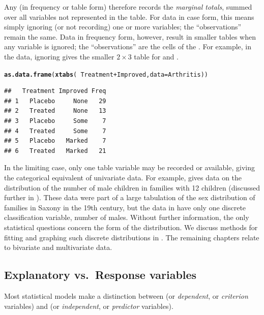 \documentclass[11pt]{book}\usepackage[]{graphicx}\usepackage[]{color}
\makeatletter
\newcommand{\hlopt}[1]{\textcolor[rgb]{0,0,0}{#1}}%
\newcommand{\hlstd}[1]{\textcolor[rgb]{0.345,0.345,0.345}{#1}}%
\newcommand{\hlkwc}[1]{\textcolor[rgb]{0.333,0.667,0.333}{#1}}%
\newcommand{\hlkwd}[1]{\textcolor[rgb]{0.737,0.353,0.396}{\textbf{#1}}}%
\newenvironment{kframe}{%
 \def\at@end@of@kframe{}%
 \ifinner\ifhmode%
  \def\at@end@of@kframe{\end{minipage}}%
  \begin{minipage}{\columnwidth}%
 \fi\fi%
 \def\FrameCommand##1{\hskip\@totalleftmargin \hskip-\fboxsep
 \colorbox{shadecolor}{##1}\hskip-\fboxsep
     \hskip-\linewidth \hskip-\@totalleftmargin \hskip\columnwidth}%
 \MakeFramed {\advance\hsize-\width
   \@totalleftmargin\z@ \linewidth\hsize
   \@setminipage}}%
 {\par\unskip\endMakeFramed%
 \at@end@of@kframe}
\newenvironment{knitrout}{}{} %
\renewenvironment{knitrout}{\small\renewcommand{\baselinestretch}{.85}}{} %
\makeatother
\begin{document}
Any \ctab (in frequency or table form) therefore records the \emph{marginal totals}, summed over all
variables not represented in the table.
For data in case form, this means simply ignoring (or not recording)
one or more variables;  the ``observations'' remain the same.
Data in frequency form, however, result in smaller tables when
any variable is ignored;  the ``observations'' are the cells of
the \ctab. For example, in the  data, ignoring 
gives the smaller $2 \times 3$ table for  and .
\begin{knitrout}
\color{fgcolor}\begin{kframe}
\begin{alltt}
\hlkwd{as.data.frame}\hlstd{(}\hlkwd{xtabs}\hlstd{(}\hlopt{~}\hlstd{Treatment} \hlopt{+} \hlstd{Improved,} \hlkwc{data}\hlstd{=Arthritis))}
\end{alltt}
\begin{verbatim}
##   Treatment Improved Freq
## 1   Placebo     None   29
## 2   Treated     None   13
## 3   Placebo     Some    7
## 4   Treated     Some    7
## 5   Placebo   Marked    7
## 6   Treated   Marked   21
\end{verbatim}
\end{kframe}
\end{knitrout}



In the limiting case, only one table variable may be recorded or
available, giving the categorical equivalent of univariate data.
For example,  gives data on the distribution
of the number of male children in families with 12 children
(discussed further in ).
These data were part of a large tabulation of the sex distribution
of families in Saxony in the 19th century, but the data in 
have only one discrete classification variable, number of males.
Without further information, the only statistical questions concern
the form of the distribution.
We discuss methods for fitting and graphing such discrete distributions
in .
The remaining chapters relate to bivariate and multivariate data.


\subsection{Explanatory vs.\ Response variables}\label{sec:exp-resp}
Most statistical models make a distinction between 
(or \emph{dependent}, or \emph{criterion} variables)
and
(or \emph{independent}, or \emph{predictor} variables).
\end{document}
